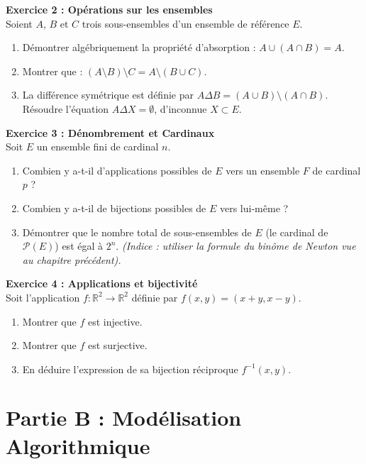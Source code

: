 \textbf{Exercice 2 : Opérations sur les ensembles} \\
Soient $A$, $B$ et $C$ trois sous-ensembles d'un ensemble de référence $E$.
\begin{enumerate}
    \item Démontrer algébriquement la propriété d'absorption : $A \cup (A \cap B) = A$.
    \item Montrer que : $(A \setminus B) \setminus C = A \setminus (B \cup C)$.
    \item La différence symétrique est définie par $A \Delta B = (A \cup B) \setminus (A \cap B)$. \\
    Résoudre l'équation $A \Delta X = \emptyset$, d'inconnue $X \subset E$.
\end{enumerate}

\textbf{Exercice 3 : Dénombrement et Cardinaux} \\
Soit $E$ un ensemble fini de cardinal $n$.
\begin{enumerate}
    \item Combien y a-t-il d'applications possibles de $E$ vers un ensemble $F$ de cardinal $p$ ?
    \item Combien y a-t-il de bijections possibles de $E$ vers lui-même ?
    \item Démontrer que le nombre total de sous-ensembles de $E$ (le cardinal de $\mathcal{P}(E)$) est égal à $2^n$. \textit{(Indice : utiliser la formule du binôme de Newton vue au chapitre précédent).}
\end{enumerate}

\textbf{Exercice 4 : Applications et bijectivité} \\
Soit l'application $f : \mathbb{R}^2 \to \mathbb{R}^2$ définie par $f(x,y) = (x+y, x-y)$.
\begin{enumerate}
    \item Montrer que $f$ est injective.
    \item Montrer que $f$ est surjective.
    \item En déduire l'expression de sa bijection réciproque $f^{-1}(x,y)$.
\end{enumerate}

\vspace{1cm}

\section*{Partie B : Modélisation Algorithmique}

